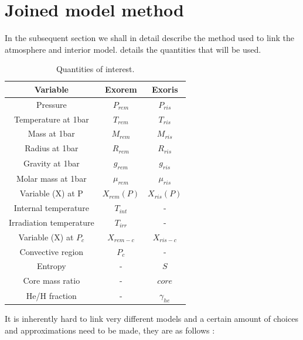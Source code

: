 \section{Joined model method}
In the subsequent section we shall in detail describe the method used to link the atmosphere and interior model.  details the quantities that will be used.\par

\begin{table}[htb]%
\centering
\caption{Quantities of interest.}
	\label{tab:QOI}
	\begin{tabular}{ccc}
		\toprule
		Variable & {Exorem}  &  {Exoris}  \\
		\midrule
        \midrule
        Pressure & {$P_{rem}$}  &  {$P_{ris}$}  \\
        \midrule
		Temperature at 1bar & {$T_{rem}$}  &  {$T_{ris}$}  \\
        \midrule
		Mass at 1bar & {$M_{rem}$}  &  {$M_{ris}$}  \\
        \midrule
		Radius at 1bar & {$R_{rem}$}  &  {$R_{ris}$}  \\
        \midrule
		Gravity at 1bar & {$g_{rem}$}  &  {$g_{ris}$}  \\
        \midrule
		Molar mass at 1bar & {$\mu_{rem}$}  &  {$\mu_{ris}$}  \\
        \midrule
		Variable (X) at P & {$X_{rem}(P)$}  &  {$X_{ris}(P)$}  \\
        \midrule
		Internal temperature & {$T_{int}$}  &  {-}  \\
        \midrule
		Irradiation temperature & {$T_{irr}$}  &  {-}  \\
        \midrule
		{Variable (X) at $P_c$} & {$X_{rem-c}$}  &  {$X_{ris-c}$}  \\
        \midrule
		Convective region & {$P_c$}  &  {-}  \\
        \midrule
		Entropy & {-}  &  {$S$}  \\
        \midrule
		Core mass ratio & {-}  &  {$core$}  \\
        \midrule
		He/H fraction & {-}  &  {$\gamma_{he}$}  \\
		\bottomrule
	\end{tabular}
\end{table}

It is inherently hard to link very different models and a certain amount of choices and approximations need to be made, they are as follows :

